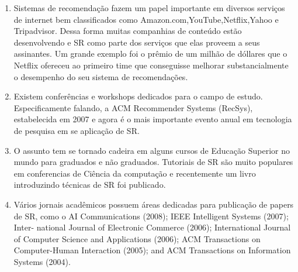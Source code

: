 \begin{enumerate}

\item Sistemas de recomendação fazem um papel importante em diversos serviços de internet bem classificados como Amazon.com,YouTube,Netflix,Yahoo e Tripadvisor. Dessa forma muitas companhias de conteúdo estão desenvolvendo e SR como parte dos serviços que elas proveem a seus assinantes. Um grande exemplo foi o prêmio de um milhão de dóllares que o Netflix ofereceu ao primeiro time que conseguisse melhorar substancialmente o desempenho do seu sistema de recomendações.

\item Existem conferências e workshops dedicados para o campo de estudo. Especificamente falando, a ACM Recommender Systems (RecSys), estabelecida em 2007 e agora é o mais importante evento anual em tecnologia de pesquisa em se aplicação de SR.

\item O assunto tem se tornado cadeira em alguns cursos de Educação Superior no mundo para graduados e não graduados. Tutoriais de SR são muito populares em conferencias de Ciência da computação e recentemente um livro introduzindo técnicas de SR foi publicado.

\item Vários jornais acadêmicos possuem áreas dedicadas para publicação de papers de SR, como o AI Communications (2008); IEEE Intelligent Systems (2007); Inter-
national Journal of Electronic Commerce (2006); International Journal of Computer Science and Applications (2006); ACM Transactions on Computer-Human Interaction (2005); and ACM Transactions on Information Systems (2004).

\end{enumerate}
